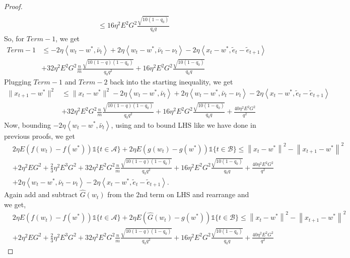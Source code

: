 \documentclass{article} %
\newcommand\norm[1]{\left\lVert#1\right\rVert}
\def\A{{\mathcal A}}
\def\B{{\mathcal B}}
\newcommand{\inner}[2]{\left\langle #1, #2 \right\rangle}
\begin{document}
\begin{proof}
\begin{align*}
        \\
        & \leq  16\eta^2 E^2G^2\frac{\sqrt{10(1-q_0)}}{q_0q}
    \end{align*}
    So, for $Term-1$, we get
    \begin{align*}
        Term-1 &\leq - 2\eta \inner{w_t - w^*}{\bar{\nu}_t} + 2\eta \inner{w_t - w^*}{\bar{\nu}_t - \nu_t} - 2\eta \inner{x_t - w^*}{\tilde{e}_t - \tilde{e}_{t+1}} 
        \\
        &+ 32\eta^2 E^2G^2\frac{n}{m} \frac{\sqrt{10(1-q) (1-q_0)}}{q_0q^2} + 16\eta^2 E^2G^2\frac{\sqrt{10(1-q_0)}}{q_0q}
    \end{align*}
    Plugging $Term-1$ and $Term-2$ back into the starting inequality, we get
    \begin{align*}
         \|x_{t+1} - w^*\|^2 &\leq \|x_t - w^*\|^2 - 2\eta \inner{w_t - w^*}{\bar{\nu}_t} + 2\eta \inner{w_t - w^*}{\bar{\nu}_t - \nu_t} - 2\eta \inner{x_t - w^*}{\tilde{e}_t - \tilde{e}_{t+1}} 
        \\
        &+ 32\eta^2 E^2G^2\frac{n}{m} \frac{\sqrt{10(1-q) (1-q_0)}}{q_0q^2} + 16\eta^2 E^2G^2\frac{\sqrt{10(1-q_0)}}{q_0q} + \frac{40 \eta^2 E^2G^2}{ q^2}
    \end{align*}
    Now, bounding $- 2\eta \inner{w_t - w^*}{\bar{\nu}_t}$, using  and  to bound LHS like we have done in previous proofs, we get
    \begin{align*}
        &2\eta E(f(w_t) - f(w^*) )\mathds{1}\{t \in \A\} + 2\eta E(g(w_t) - g(w^*))\mathds{1}\{t \in \B\} \leq \norm{x_{t} - w^*}^2 - \norm{x_{t+1} - w^*}^2
        \\
        & + 2\eta^2EG^2 + \frac{2}{3}\eta^2E^3G^2 + 32\eta^2 E^2G^2\frac{n}{m} \frac{\sqrt{10(1-q) (1-q_0)}}{q_0q^2} + 16\eta^2 E^2G^2\frac{\sqrt{10(1-q_0)}}{q_0q} + \frac{40 \eta^2 E^2G^2}{ q^2}
        \\
        & + 2\eta \inner{w_t - w^*}{\bar{\nu}_t - \nu_t} - 2\eta \inner{x_t - w^*}{\tilde{e}_t - \tilde{e}_{t+1}}. 
    \end{align*}
    Again add and subtract $\hat{G}(w_t)$ from the 2nd term on LHS and rearrange and we get,
    \begin{align*}
        &2\eta E(f(w_t) - f(w^*) )\mathds{1}\{t \in \A\} + 2\eta E(\hat{G}(w_t) - g(w^*))\mathds{1}\{t \in \B\} \leq \norm{x_{t} - w^*}^2 - \norm{x_{t+1} - w^*}^2
        \\
        & + 2\eta^2EG^2 + \frac{2}{3}\eta^2E^3G^2 + 32\eta^2 E^2G^2\frac{n}{m} \frac{\sqrt{10(1-q) (1-q_0)}}{q_0q^2} + 16\eta^2 E^2G^2\frac{\sqrt{10(1-q_0)}}{q_0q} + \frac{40 \eta^2 E^2G^2}{ q^2}

\end{align*}
\end{proof}
\end{document}
